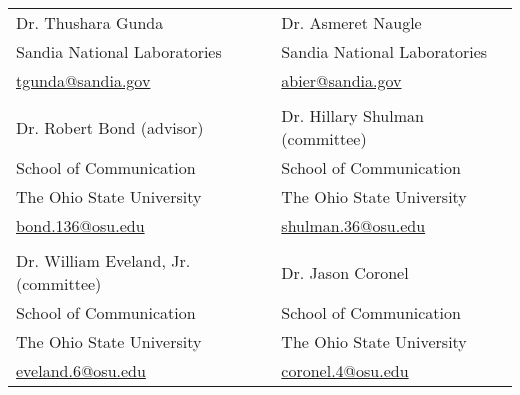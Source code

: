 \documentclass[letterpaper, 10pt]{extarticle}
\begin{document}
\vspace{0.5em}
\begin{center}
\begin{tabular}{p{}p{}}
{Dr. Thushara Gunda} & Dr. Asmeret Naugle\\
Sandia National Laboratories & Sandia National Laboratories\\
\href{mailto:tgunda@sandia.gov}{tgunda@sandia.gov} & \href{mailto:abier@sandia.gov}{abier@sandia.gov}\\
\\
{Dr. Robert Bond (advisor)} & {Dr. Hillary Shulman (committee)}\\
School of Communication & School of Communication\\
The Ohio State University & The Ohio State University\\
\href{mailto:bond.136@osu.edu}{bond.136@osu.edu} & \href{mailto:shulman.36@osu.edu}{shulman.36@osu.edu}\\
\\
{Dr. William Eveland, Jr. (committee)} & {Dr. Jason Coronel}\\
School of Communication & School of Communication\\
The Ohio State University & The Ohio State University\\
\href{mailto:eveland.6@osu.edu}{eveland.6@osu.edu} & \href{mailto:coronel.4@osu.edu}{coronel.4@osu.edu}
\end{tabular}
\end{center}
\end{document}
